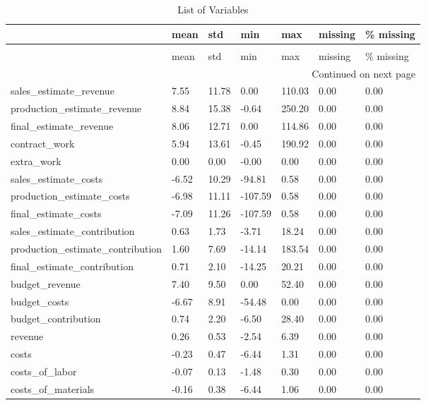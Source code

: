 \begin{landscape}\begin{longtable}[h!]{lllllll}
\caption{List of Variables} \label{eda_1} \\
\toprule
 & mean & std & min & max & missing & \% missing \\
\midrule
\endfirsthead
\caption[]{List of Variables} \\
\toprule
 & mean & std & min & max & missing & \% missing \\
\midrule
\endhead
\midrule
\multicolumn{7}{r}{Continued on next page} \\
\midrule
\endfoot
\bottomrule
\endlastfoot
sales_estimate_revenue & 7.55 & 11.78 & 0.00 & 110.03 & 0.00 & 0.00 \\
production_estimate_revenue & 8.84 & 15.38 & -0.64 & 250.20 & 0.00 & 0.00 \\
final_estimate_revenue & 8.06 & 12.71 & 0.00 & 114.86 & 0.00 & 0.00 \\
contract_work & 5.94 & 13.61 & -0.45 & 190.92 & 0.00 & 0.00 \\
extra_work & 0.00 & 0.00 & -0.00 & 0.00 & 0.00 & 0.00 \\
sales_estimate_costs & -6.52 & 10.29 & -94.81 & 0.58 & 0.00 & 0.00 \\
production_estimate_costs & -6.98 & 11.11 & -107.59 & 0.58 & 0.00 & 0.00 \\
final_estimate_costs & -7.09 & 11.26 & -107.59 & 0.58 & 0.00 & 0.00 \\
sales_estimate_contribution & 0.63 & 1.73 & -3.71 & 18.24 & 0.00 & 0.00 \\
production_estimate_contribution & 1.60 & 7.69 & -14.14 & 183.54 & 0.00 & 0.00 \\
final_estimate_contribution & 0.71 & 2.10 & -14.25 & 20.21 & 0.00 & 0.00 \\
budget_revenue & 7.40 & 9.50 & 0.00 & 52.40 & 0.00 & 0.00 \\
budget_costs & -6.67 & 8.91 & -54.48 & 0.00 & 0.00 & 0.00 \\
budget_contribution & 0.74 & 2.20 & -6.50 & 28.40 & 0.00 & 0.00 \\
revenue & 0.26 & 0.53 & -2.54 & 6.39 & 0.00 & 0.00 \\
costs & -0.23 & 0.47 & -6.44 & 1.31 & 0.00 & 0.00 \\
costs_of_labor & -0.07 & 0.13 & -1.48 & 0.30 & 0.00 & 0.00 \\
costs_of_materials & -0.16 & 0.38 & -6.44 & 1.06 & 0.00 & 0.00 \\

\end{longtable}
\end{landscape}
